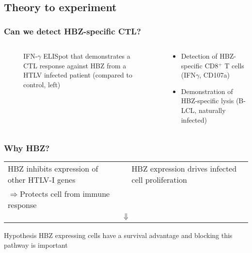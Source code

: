 \documentclass[slidescentered,compress]{beamer}
\begin{document}
\subsection{Theory to experiment}

\frame
{
\frametitle{Can we detect HBZ-specific CTL?}

\begin{columns}[c]

\begin{column}{6cm}
\begin{figure}
\caption{IFN-$\gamma$ ELISpot that demonstrates a CTL response against HBZ from a HTLV infected patient (compared to control, left)}
\end{figure}
\end{column}

\begin{column}{4cm}
\begin{itemize}
\item Detection of HBZ-specific CD8$^+$ T cells (IFN$\gamma$, CD107a)
\item Demonstration of HBZ-specific lysis (B-LCL, naturally infected)
\end{itemize}
\end{column}

\end{columns}

}

\frame
{
\frametitle{Why HBZ?}

\begin{table}[htbp]
\centering
\renewcommand{\arraystretch}{1.2}
\begin{tabulary}{10cm}{|L|c|L|}
HBZ inhibits expression of other HTLV-I genes & & HBZ expression drives infected cell proliferation \\
$\Rightarrow$Protects cell from immune response & & \\ 
 \\ 
\end{tabulary}
\end{table}

\begin{block}{Hypothesis}
HBZ expressing cells have a survival advantage and blocking this pathway is important
\end{block}

}

\end{document}
